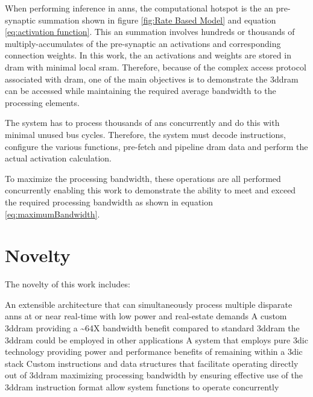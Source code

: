 When performing inference in \acp{ann}, the computational hotspot is the \ac{an} pre-synaptic summation shown in figure \ref{fig:Rate Based Model} and equation \eqref{eq:activation function}.
This \ac{an} summation involves hundreds or thousands of multiply-accumulates of the pre-synaptic \ac{an} activations and corresponding connection weights. 
In this work, the \ac{an} activations and weights are stored in \ac{dram} with minimal local \ac{sram}. 
Therefore, because of the complex access protocol associated with \ac{dram}, one of the main objectives is to demonstrate the \ac{3ddram} can be accessed while maintaining the required average bandwidth to the processing elements.
\iffalse with relatively high levels of bus efficiency. \fi

The system has to process thousands of \acp{an} concurrently and do this with minimal unused bus cycles.
Therefore, the system must decode instructions, configure the various functions, pre-fetch and pipeline \ac{dram} data and perform the actual activation calculation. 

To maximize the processing bandwidth, these operations are all performed concurrently enabling this work to demonstrate the ability to meet and exceed the required \iffalse \SI[per-mode=symbol]{32}{\tera \bit \per \second} of\fi processing bandwidth as shown in equation \eqref{eq:maximumBandwidth}.

\iffalse
The problem associated with processing \acp{ann} are outlined in section \ref{sec:The Problem}. 
\fi

\section[Novelty]{Novelty}
\label{sec:Novelty}

The novelty of this work includes:
\begin{outline}
    \1 An extensible architecture that can simultaneously process multiple disparate \ac{ann}s at or near real-time 
      \2 with low power and real-estate demands
    \1 A custom \ac{3ddram} providing a \textasciitilde 64X bandwidth benefit compared to standard \ac{3ddram}
      \2 the \ac{3ddram} could be employed in other applications
    \1 A system that employs pure \ac{3dic} technology
      \2 providing power and performance benefits of remaining within a \ac{3dic} stack
    \1 Custom instructions and data structures that facilitate operating directly out of \ac{3ddram} 
      \2 maximizing processing bandwidth by ensuring effective use of the \ac{3ddram}
      \2 instruction format allow system functions to operate concurrently 
\end{outline}


